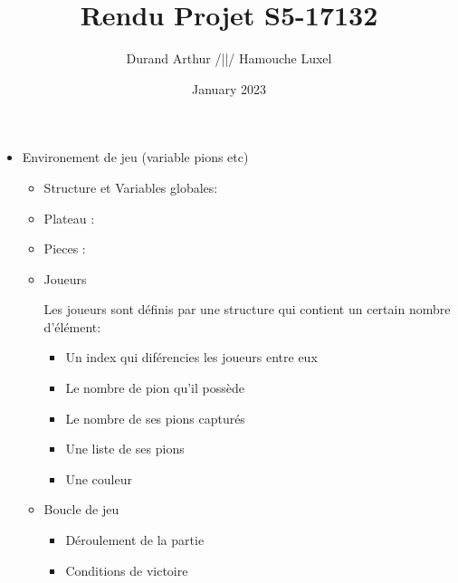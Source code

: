 \documentclass[10pt,a4paper,oneside]{report}
\title{Rendu Projet S5-17132}
\author{Durand Arthur /||/ Hamouche Luxel}
\date{January 2023}
\begin{document}


\tableofcontents
\cleardoublepage











\begin{itemize}
    \item Environement de jeu (variable pions etc)
    \begin{itemize}
        \item Structure et Variables globales:
        
        \item Plateau :



        \item Pieces :
        \\
               
        \item Joueurs

        Les joueurs sont définis par une structure qui contient un certain nombre d'élément:
        \begin{itemize}
            \item Un index qui diférencies les joueurs entre eux
            \item Le nombre de pion qu'il possède
            \item Le nombre de ses pions capturés
            \item Une liste de ses pions
            \item Une couleur
        \end{itemize}
        \item Boucle de jeu
        \begin{itemize}
            \item Déroulement de la partie 
            \item Conditions de victoire
        \end{itemize}
    \end{itemize}


\end{itemize}
\end{document}

